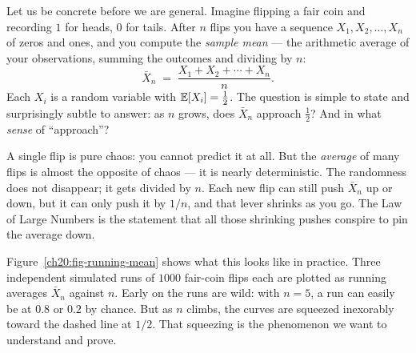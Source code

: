 Let us be concrete before we are general. Imagine flipping a fair coin and recording $1$ for heads, $0$ for tails. After $n$ flips you have a sequence $X_1, X_2, \dots, X_n$ of zeros and ones, and you compute the \emph{sample mean} --- the arithmetic average of your observations, summing the outcomes and dividing by $n$:
\[
  \bar{X}_n \;=\; \frac{X_1 + X_2 + \cdots + X_n}{n}.
\]
Each $X_i$ is a random variable with $\operatorname{\mathbb{E}}[X_i] = \tfrac12$. The question is simple to state and surprisingly subtle to answer: as $n$ grows, does $\bar{X}_n$ approach $\tfrac12$? And in what \emph{sense} of ``approach''?

\begin{intuitionbox}
A single flip is pure chaos: you cannot predict it at all. But the \emph{average} of many flips is almost the opposite of chaos --- it is nearly deterministic. The randomness does not disappear; it gets divided by $n$. Each new flip can still push $\bar X_n$ up or down, but it can only push it by $1/n$, and that lever shrinks as you go. The Law of Large Numbers is the statement that all those shrinking pushes conspire to pin the average down.
\end{intuitionbox}

Figure~\ref{ch20:fig-running-mean} shows what this looks like in practice. Three independent simulated runs of $1000$ fair-coin flips each are plotted as running averages $\bar X_n$ against $n$. Early on the runs are wild: with $n=5$, a run can easily be at $0.8$ or $0.2$ by chance. But as $n$ climbs, the curves are squeezed inexorably toward the dashed line at $1/2$. That squeezing is the phenomenon we want to understand and prove.

